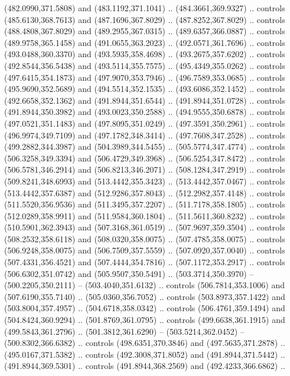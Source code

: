 \begin{scope}[cm={{1.25,0.0,0.0,-1.25,(0.0,743.43331)}}]
    (482.0990,371.5808) and (483.1192,371.1041) .. (484.3661,369.9327) .. controls
    (485.6130,368.7613) and (487.1696,367.8029) .. (487.8252,367.8029) .. controls
    (488.4808,367.8029) and (489.2955,367.0315) .. (489.6357,366.0887) .. controls
    (489.9758,365.1458) and (491.0655,363.2023) .. (492.0571,361.7696) .. controls
    (493.0488,360.3370) and (493.5935,358.4698) .. (493.2675,357.6202) .. controls
    (492.8544,356.5438) and (493.5114,355.7575) .. (495.4349,355.0262) .. controls
    (497.6415,354.1873) and (497.9070,353.7946) .. (496.7589,353.0685) .. controls
    (495.9690,352.5689) and (494.5514,352.1535) .. (493.6086,352.1452) .. controls
    (492.6658,352.1362) and (491.8944,351.6544) .. (491.8944,351.0728) .. controls
    (491.8944,350.3982) and (493.0023,350.2588) .. (494.9555,350.6878) .. controls
    (497.0521,351.1483) and (497.8095,351.0249) .. (497.3591,350.2961) .. controls
    (496.9974,349.7109) and (497.1782,348.3414) .. (497.7608,347.2528) .. controls
    (499.2882,344.3987) and (504.3989,344.5455) .. (505.5774,347.4774) .. controls
    (506.3258,349.3394) and (506.4729,349.3968) .. (506.5254,347.8472) .. controls
    (506.5781,346.2914) and (506.8213,346.2071) .. (508.1284,347.2919) .. controls
    (509.8241,348.6993) and (513.4442,355.3423) .. (513.4442,357.0467) .. controls
    (513.4442,357.6387) and (512.9286,357.8043) .. (512.2982,357.4148) .. controls
    (511.5520,356.9536) and (511.3495,357.2207) .. (511.7178,358.1805) .. controls
    (512.0289,358.9911) and (511.9584,360.1804) .. (511.5611,360.8232) .. controls
    (510.5901,362.3943) and (507.3168,361.0519) .. (507.9697,359.3504) .. controls
    (508.2532,358.6118) and (508.0320,358.0075) .. (507.4785,358.0075) .. controls
    (506.9248,358.0075) and (506.7509,357.5559) .. (507.0920,357.0040) .. controls
    (507.4331,356.4521) and (507.4444,354.7816) .. (507.1172,353.2917) .. controls
    (506.6302,351.0742) and (505.9507,350.5491) .. (503.3714,350.3970) --
    (500.2205,350.2111) -- (503.4040,351.6132) .. controls (506.7814,353.1006) and
    (507.6190,355.7140) .. (505.0360,356.7052) .. controls (503.8973,357.1422) and
    (503.8004,357.4957) .. (504.6718,358.0342) .. controls (506.4761,359.1494) and
    (504.8424,360.9294) .. (501.8769,361.0795) .. controls (499.6638,361.1915) and
    (499.5843,361.2796) .. (501.3812,361.6290) -- (503.5214,362.0452) --
    (500.8302,366.6382) .. controls (498.6351,370.3846) and (497.5635,371.2878) ..
    (495.0167,371.5382) .. controls (492.3008,371.8052) and (491.8944,371.5442) ..
    (491.8944,369.5301) .. controls (491.8944,368.2569) and (492.4233,366.6862) ..

\end{scope}
